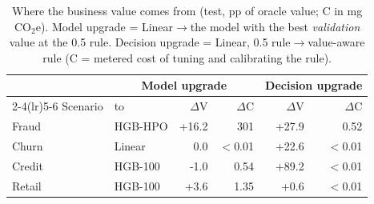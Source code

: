 \begin{table}[t]
\centering
\caption{Where the business value comes from (test, pp of oracle value; C in mg CO$_2$e). Model upgrade = Linear$\rightarrow$the model with the best \emph{validation} value at the 0.5 rule. Decision upgrade = Linear, 0.5 rule$\rightarrow$value-aware rule (C = metered cost of tuning and calibrating the rule).}
\label{tab:layers}
\scriptsize
\setlength{\tabcolsep}{2.6pt}
\begin{tabular}{llrrrr}
\toprule
 & \multicolumn{3}{c}{Model upgrade} & \multicolumn{2}{c}{Decision upgrade} \\
\cmidrule(lr){2-4}\cmidrule(lr){5-6}
Scenario & to & $\Delta$V & $\Delta$C & $\Delta$V & $\Delta$C \\ \midrule
Fraud & HGB-HPO & +16.2 & 301 & +27.9 & 0.52 \\
Churn & Linear & 0.0 & $<$0.01 & +22.6 & $<$0.01 \\
Credit & HGB-100 & -1.0 & 0.54 & +89.2 & $<$0.01 \\
Retail & HGB-100 & +3.6 & 1.35 & +0.6 & $<$0.01 \\
\bottomrule
\end{tabular}
\end{table}
